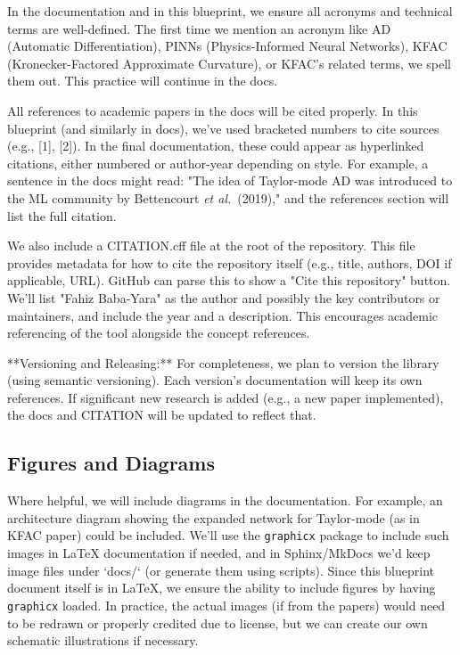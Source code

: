 \documentclass[11pt]{article}
\begin{document}
In the documentation and in this blueprint, we ensure all acronyms and technical terms are well-defined. The first time we mention an acronym like AD (Automatic Differentiation), PINNs (Physics-Informed Neural Networks), KFAC (Kronecker-Factored Approximate Curvature), or KFAC's related terms, we spell them out. This practice will continue in the docs.

All references to academic papers in the docs will be cited properly. In this blueprint (and similarly in docs), we've used bracketed numbers to cite sources (e.g., [1], [2]). In the final documentation, these could appear as hyperlinked citations, either numbered or author-year depending on style. For example, a sentence in the docs might read: "The idea of Taylor-mode AD was introduced to the ML community by Bettencourt \textit{et al.}\ (2019)\cite{Bettencourt2019}," and the references section will list the full citation. 

We also include a CITATION.cff file at the root of the repository. This file provides metadata for how to cite the repository itself (e.g., title, authors, DOI if applicable, URL). GitHub can parse this to show a "Cite this repository" button. We'll list "Fahiz Baba-Yara" as the author and possibly the key contributors or maintainers, and include the year and a description. This encourages academic referencing of the tool alongside the concept references.

**Versioning and Releasing:** For completeness, we plan to version the library (using semantic versioning). Each version's documentation will keep its own references. If significant new research is added (e.g., a new paper implemented), the docs and CITATION will be updated to reflect that.

\subsection{Figures and Diagrams}

Where helpful, we will include diagrams in the documentation. For example, an architecture diagram showing the expanded network for Taylor-mode (as in KFAC paper) could be included. We'll use the \texttt{graphicx} package to include such images in LaTeX documentation if needed, and in Sphinx/MkDocs we'd keep image files under `docs/` (or generate them using scripts). Since this blueprint document itself is in LaTeX, we ensure the ability to include figures by having \texttt{graphicx} loaded. In practice, the actual images (if from the papers) would need to be redrawn or properly credited due to license, but we can create our own schematic illustrations if necessary.
\end{document}
